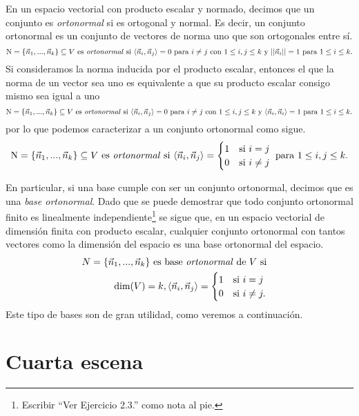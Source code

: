 \documentclass[12pt,dvipsnames]{article}
\numberwithin{equation}{section}
\begin{document}
En un espacio vectorial con producto escalar y normado, decimos que un conjunto es \emph{ortonormal} si es ortogonal y normal. Es decir, un conjunto ortonormal es un conjunto de vectores de norma uno que son ortogonales entre sí. 
\[
    \text{N}=\{\vec{n}_1,...,\vec{n}_k\}\subseteq V \ \text{es \emph{ortonormal} si} \ \langle \vec{n}_i , \vec{n}_j \rangle = 0 \text{ para } i\neq j \text{ con } 1\le i,j\le k \text{ y } ||\vec{n}_i||=1 \text{ para } 1\le i\le k.
\]
Si consideramos la norma inducida por el producto escalar, entonces el que la norma de un vector sea uno es equivalente a que su producto escalar consigo mismo sea igual a uno
\[
    \text{N}=\{\vec{n}_1,...,\vec{n}_k\}\subseteq V \ \text{es \emph{ortonormal} si} \ \langle \vec{n}_i , \vec{n}_j \rangle = 0 \text{ para } i\neq j \text{ con } 1\le i,j\le k \text{ y } \langle \vec{n}_i , \vec{n}_i \rangle=1 \text{ para } 1\le i\le k.
\]
por lo que podemos caracterizar a un conjunto ortonormal como sigue.
\[
    \text{N}=\{\vec{n}_1,...,\vec{n}_k\}\subseteq V \ \text{es \emph{ortonormal} si} \ \langle \vec{n}_i , \vec{n}_j \rangle = \begin{cases} 1 &\text{si } i=j \\ 0 &\text{si } i\neq j \end{cases} \text{ para } 1\le i,j\le k.
\]

En particular, si una base cumple con ser un conjunto ortonormal, decimos que es una \emph{base ortonormal}. Dado que se puede demostrar que todo conjunto ortonormal finito es linealmente independiente\footnote{Escribir ``Ver Ejercicio 2.3.'' como nota al pie.} se sigue que, en un espacio vectorial de dimensión finita con producto escalar, cualquier conjunto ortonormal con tantos vectores como la dimensión del espacio es una base ortonormal del espacio. 
\begin{align*}
    N=\{\vec{n}_1,...,\vec{n}_k\} \text{ es base \emph{ortonormal} de } V \text{ si}& & &\\
    \text{dim}(V)=k, \langle \vec{n}_i , \vec{n}_j \rangle = \begin{cases} 1 &\text{si } i=j \\ 0 &\text{si } i\neq j. \end{cases}
\end{align*}
Este tipo de bases son de gran utilidad, como veremos a continuación.


\newpage
\section{Cuarta escena}
\end{document}

